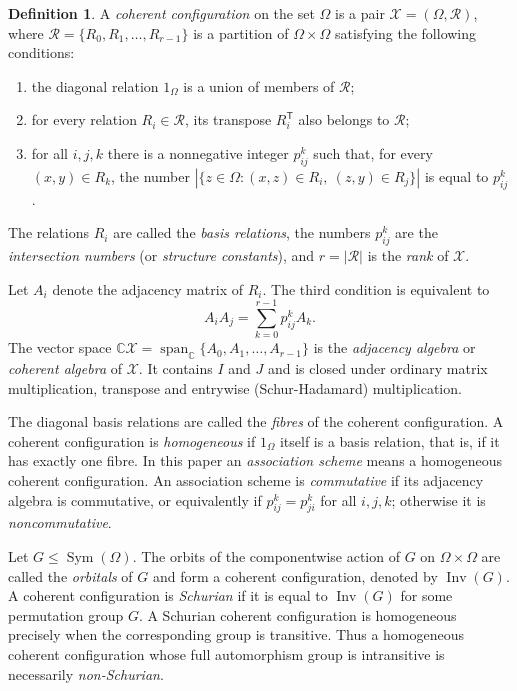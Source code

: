 \documentclass[11pt]{article}
\theoremstyle{definition}
\newtheorem{definition}[theorem]{Definition}
\theoremstyle{remark}
\begin{document}
\begin{definition}
A \emph{coherent configuration} on the set $\Omega$ is a pair
$\mathcal X=(\Omega,\mathcal R)$, where
$ \mathcal R=\{R_0,R_1,\ldots,R_{r-1}\}$
is a partition of $\Omega\times\Omega$ satisfying the following conditions:
\begin{enumerate}
 \item the diagonal relation $1_{\Omega}$ is a union of members of $\mathcal R$;
 \item for every relation $R_i\in\mathcal R$, its transpose $R_i^{\mathsf T}$ also belongs
       to $\mathcal R$;
 \item for all $i,j,k$ there is a nonnegative integer $p_{ij}^{k}$ such that,
       for every $(x,y)\in R_k$, the number
       $|\{z\in\Omega:(x,z)\in R_i,\ (z,y)\in R_j\}|$ is equal to $p_{ij}^{k}$.
\end{enumerate}
The relations $R_i$ are called the \emph{basis relations}, the numbers
$p_{ij}^{k}$ are the \emph{intersection numbers} (or \emph{structure constants}), and
$r=|\mathcal R|$ is the \emph{rank} of $\mathcal X$.
\end{definition}

Let $A_i$ denote the adjacency matrix of $R_i$.  The third condition is
equivalent to
\[ A_iA_j=\sum_{k=0}^{r-1}p_{ij}^{k}A_k. \]
The vector space $\mathbb C\mathcal X   
=\operatorname{span}_{\mathbb C}\{A_0,A_1,\ldots,A_{r-1}\}$
is the \emph{adjacency algebra} or \emph{coherent algebra} of
$\mathcal X$.  It contains $I$ and $J$ and is closed under ordinary matrix
multiplication, transpose and entrywise (Schur-Hadamard) multiplication.

The diagonal basis relations are called the \emph{fibres} of the coherent
configuration.  A coherent configuration is \emph{homogeneous} if
$1_{\Omega}$ itself is a basis relation, that is, if it has exactly one
fibre.  In this paper an \emph{association scheme} means a homogeneous
coherent configuration.  An association scheme is \emph{commutative} if its
adjacency algebra is commutative, or equivalently if
$ p_{ij}^{k}=p_{ji}^{k}$
for all $i,j,k$; otherwise it is \emph{noncommutative}.

Let $G\leq\operatorname{Sym}(\Omega)$.  The orbits of the componentwise
action of $G$ on $\Omega\times\Omega$ are called the \emph{orbitals} of
$G$ and form a coherent configuration, denoted by $\operatorname{Inv}(G)$.
A coherent configuration is \emph{Schurian} if it is equal to
$\operatorname{Inv}(G)$ for some permutation group $G$.  A Schurian coherent
configuration is homogeneous precisely when the corresponding group is
transitive.  Thus a homogeneous coherent configuration whose full
automorphism group is intransitive is necessarily \emph{non-Schurian}.
\end{document}
